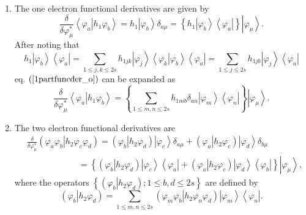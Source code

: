 \documentclass[aps,preprint]{revtex4}%
\begin{document}
\begin{enumerate}
\item The one electron functional derivatives are given by
\begin{equation}
\frac{\delta}{\delta\varphi_{\mu}^{\ast}}\left\langle \left.  \varphi
_{a}\right\vert h_{1}\varphi_{b}\right\rangle =h_{1}\left\vert \varphi
_{b}\right\rangle \delta_{a\mu}=\left\{  h_{1}\left\vert \varphi
_{b}\right\rangle \left\langle \varphi_{a}\right\vert \right\}  \left\vert
\varphi_{\mu}\right\rangle . \label{1partfuncder_o}%
\end{equation}
After noting that
\begin{equation}
h_{1}\left\vert \varphi_{b}\right\rangle \left\langle \varphi_{a}\right\vert
=\sum_{1\leq j,k\leq2s}h_{1jk}\left\vert \varphi_{j}\right\rangle \left\langle
\left.  \varphi_{k}\right\vert \varphi_{b}\right\rangle \left\langle
\varphi_{a}\right\vert =\sum_{1\leq j\leq2s}h_{1jb}\left\vert \varphi
_{j}\right\rangle \left\langle \varphi_{a}\right\vert
\end{equation}
eq. $\left(  \ref{1partfuncder_o}\right)  $ can be expanded as
\begin{equation}
\frac{\delta}{\delta\varphi_{\mu}^{\ast}}\left\langle \left.  \varphi
_{a}\right\vert h_{1}\varphi_{b}\right\rangle =\left\{  \sum_{1\leq m,n\leq
2s}h_{1mb}\delta_{an}\left\vert \varphi_{m}\right\rangle \left\langle
\varphi_{n}\right\vert \right\}  \left\vert \varphi_{\mu}\right\rangle .
\label{1partfuncder_ex}%
\end{equation}


\item The two electron functional derivatives are
\begin{align}
&  \frac{\delta}{\delta\varphi_{\mu}^{\ast}}\left(  \left.  \varphi_{a}%
\varphi_{b}\right\vert h_{2}\varphi_{c}\varphi_{d}\right)  =\left(  \left.
\varphi_{b}\right\vert h_{2}\varphi_{d}\right)  \left\vert \varphi
_{c}\right\rangle \delta_{a\mu}+\left(  \left.  \varphi_{a}\right\vert
h_{2}\varphi_{c}\right)  \left\vert \varphi_{d}\right\rangle \delta_{b\mu
}\nonumber\\
&  \qquad\qquad\qquad\left.  =\right.  \left\{  \left(  \left.  \varphi
_{b}\right\vert h_{2}\varphi_{d}\right)  \left\vert \varphi_{c}\right\rangle
\left\langle \varphi_{a}\right\vert +\left(  \left.  \varphi_{a}\right\vert
h_{2}\varphi_{c}\right)  \left\vert \varphi_{d}\right\rangle \left\langle
\varphi_{b}\right\vert \right\}  \left\vert \varphi_{\mu}\right\rangle ,
\label{2partfuncder_o}%
\end{align}
where the operators $\left\{  \left(  \left.  \varphi_{b}\right\vert
h_{2}\varphi_{d}\right)  ;1\leq b,d\leq2s\right\}  $ are defined by
\begin{equation}
\left(  \left.  \varphi_{b}\right\vert h_{2}\varphi_{d}\right)  =\sum_{1\leq
m,n\leq2s}\left(  \left.  \varphi_{m}\varphi_{b}\right\vert h_{2}\varphi
_{n}\varphi_{d}\right)  \left\vert \varphi_{m}\right\rangle \left\langle
\varphi_{n}\right\vert .
\end{equation}

\end{enumerate}
\end{document}
